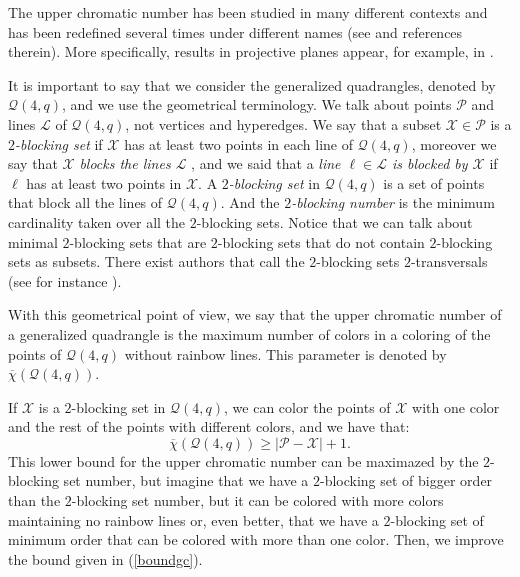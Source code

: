 \documentclass[12pt]{article}
\begin{document}
The upper chromatic number has been studied in many different contexts and has
been redefined several times under different names (see
\cite{abn,am,af,ess,fmo23,jks,k,ms,mnr} and references therein). More specifically, results
in projective planes appear, for example, in \cite{daisyPP,bhs,bt}.

It is important to say that we {consider} the generalized quadrangles, denoted by $\mathcal{Q}(4,q)$, and we use the geometrical terminology. We talk about points $\mathcal{P}$ and lines $\mathcal{L}$ of $\mathcal{Q}(4,q)$, not vertices and hyperedges. 
We say that a subset $\mathcal{X}\in \mathcal{P}$  is a {\emph{$2$-blocking set}} if $\mathcal{X}$ has at least two points in each line of $\mathcal{Q}(4,q)$, moreover we say that $\mathcal{X}$ {\emph{blocks the lines $\mathcal{L}$} }, and we said that a {\emph{line $\ell\in \mathcal{L}$ is {blocked} by $\mathcal{X}$}} if $\ell$ has at least two points in $\mathcal{X}$. A {\emph{$2$-blocking set}} in $\mathcal{Q}(4,q)$ is a set of points that block all the lines of  $\mathcal{Q}(4,q)$. And the {\emph{$2$-blocking number}} is the minimum cardinality taken over all the $2$-blocking sets. Notice that we can talk about minimal $2$-blocking sets that are $2$-blocking sets that do not contain $2$-blocking sets as subsets. There exist {authors} that call the $2$-blocking sets $2$-transversals (see for instance \cite{AMMV17}).

With this geometrical point of view, we say that the upper chromatic number of a generalized quadrangle is the maximum number of colors in a coloring of the points of $\mathcal{Q}(4,q)$ without rainbow lines. This parameter is denoted by $\overline\chi(\mathcal{Q}(4,q))$.

{If $\mathcal{X}$ is a $2$-blocking set} in $\mathcal{Q}(4,q)$, we can color {the points of $\mathcal{X}$} with one color and the rest of the points with different colors, and we have that: 
\begin{equation}\label{eq:natural2} \overline\chi({\mathcal{Q}(4,q)})\geq |\mathcal{P}-\mathcal{X}|+1.\end{equation}\label{boundgc}
This lower bound for the upper chromatic number can be maximazed by the $2$-blocking set number, but imagine that we have a $2$-blocking set of bigger order than the $2$-blocking set number, but it can be {colored} with more colors maintaining no rainbow lines or, even better, that we have a $2$-blocking set of minimum order that can be colored with more than one color. Then, we improve the bound given in (\ref{boundgc}).
\end{document}
